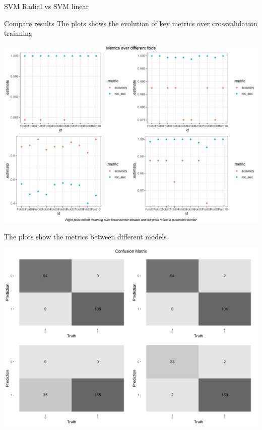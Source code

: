 \documentclass[
  ignorenonframetext,
]{article}
\begin{document}
\begin{frame}[fragile]{SVM Radial vs SVM linear}
\begin{block}{Compare results}
The plots shows the evolution of key metrics over crossvalidation trainning

\begin{center}\includegraphics{_main_files/figure-beamer/unnamed-chunk-71-1} \end{center}

The plots show the metrics between different models

\begin{center}\includegraphics{_main_files/figure-beamer/unnamed-chunk-72-1} \end{center}


\end{block}
\end{frame}
\end{document}
